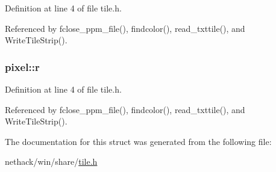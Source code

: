 Definition at line 4 of file tile.\+h.



Referenced by fclose\+\_\+ppm\+\_\+file(), findcolor(), read\+\_\+txttile(), and Write\+Tile\+Strip().

\hypertarget{structpixel_aa54a32268c2ddf156577cfc79a858d58}{
\subsubsection[{r}]{ pixel\+::r}}\label{structpixel_aa54a32268c2ddf156577cfc79a858d58}


Definition at line 4 of file tile.\+h.



Referenced by fclose\+\_\+ppm\+\_\+file(), findcolor(), read\+\_\+txttile(), and Write\+Tile\+Strip().



The documentation for this struct was generated from the following file\+:\begin{DoxyCompactItemize}
\item 
nethack/win/share/\hyperlink{tile_8h}{tile.\+h}\end{DoxyCompactItemize}
